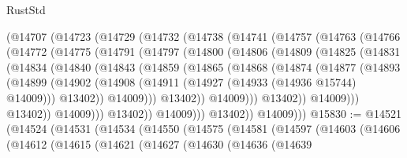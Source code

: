 \begin{lexlean}{RustStd}
\begin{coremodule}
    (@14707
      (@14723
        (@14729
          (@14732
            (@14738
              (@14741
                (@14757
                  (@14763
                    (@14766
                      (@14772
                        (@14775
                          (@14791
                            (@14797
                              (@14800
                                (@14806
                                  (@14809
                                    (@14825
                                      (@14831
                                        (@14834
                                          (@14840
                                            (@14843
                                              (@14859
                                                (@14865
                                                  (@14868
                                                    (@14874
                                                      (@14877
                                                        (@14893
                                                          (@14899
                                                            (@14902
                                                              (@14908
                                                                (@14911
                                                                  (@14927
                                                                    (@14933
                                                                      (@14936 @15744)
                                                                      @14009)))
                                                                @13402))
                                                            @14009)))
                                                      @13402))
                                                  @14009)))
                                            @13402))
                                        @14009)))
                                  @13402))
                              @14009)))
                        @13402))
                    @14009)))
              @13402))
          @14009)))
@15830 := @14521
    (@14524
      (@14531
        (@14534
          (@14550
            (@14575
              (@14581
                (@14597
                  (@14603
                    (@14606
                      (@14612
                        (@14615
                          (@14621
                            (@14627
                              (@14630
                                (@14636
                                  (@14639

\end{coremodule}
\end{lexlean}
